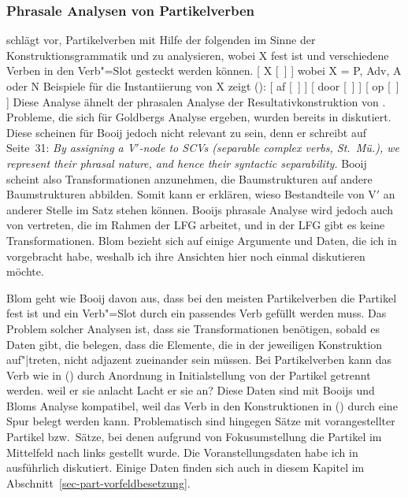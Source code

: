 \subsubsection{Phrasale Analysen von Partikelverben}
\label{sec-phrasal-pv}

\citet[Abschnitt~2]{Booij2002a} schlägt vor, Partikelverben mit Hilfe der folgenden \Konstruktion im
Sinne der Konstruktionsgrammatik und
\citet{Jackendoff97a}
zu analysieren, wobei X fest ist und verschiedene Verben in den
Verb"=Slot gesteckt werden können.
\ea
{}[ X [~] ] wobei X = P, Adv, A oder N
\z
Beispiele für die Instantiierung von X zeigt ():
\eal
\label{particle-konstruktionen}
\ex {}[ af   [~] ]
\ex {}[ door [~] ]
\ex {}[ op   [~] ]
\zl 
Diese Analyse ähnelt der phrasalen Analyse der Resultativkonstruktion von
\citet{Goldberg95a}. Probleme, die sich für Goldbergs Analyse ergeben,
wurden bereits in 
diskutiert. Diese scheinen für Booij jedoch nicht relevant zu sein,
denn er schreibt auf Seite~31: \emph{By assigning a V$'$-node to SCVs (separable complex verbs, St.\ Mü.),
we represent their phrasal nature, and hence their syntactic separability.} Booij
scheint also Transformationen anzunehmen, die Baumstrukturen
auf andere Baumstrukturen abbilden. Somit kann er erklären, wieso Bestandteile
von V$'$ an anderer Stelle im Satz stehen können.
Booijs phrasale Analyse wird jedoch auch von \citet{Blom2005a} vertreten,
die im Rahmen der LFG arbeitet,
und in der LFG gibt es keine Transformationen. Blom bezieht sich auf einige Argumente und Daten, 
die ich in 
vorgebracht habe, weshalb ich ihre Ansichten hier noch einmal diskutieren möchte.

Blom geht wie Booij davon aus, dass bei den meisten Partikelverben die Partikel fest ist und 
ein Verb"=Slot durch ein passendes Verb gefüllt werden muss. Das Problem solcher Analysen ist,
dass sie Transformationen benötigen, sobald es Daten gibt, die belegen, dass die Elemente,
die in der jeweiligen Konstruktion auf"|treten, nicht adjazent zueinander sein müssen. Bei Partikelverben
kann das Verb wie in () durch Anordnung in Initialstellung von der Partikel getrennt werden.
\eal
\ex weil er sie anlacht
\ex Lacht er sie an?
\zl
Diese Daten sind mit Booijs und Bloms Analyse kompatibel, weil das Verb in den Konstruktionen
in () durch eine Spur belegt werden kann. Problematisch sind hingegen Sätze mit vorangestellter
Partikel bzw.\ Sätze, bei denen aufgrund von Fokusumstellung die Partikel im Mittelfeld nach
links gestellt wurde. Die Voranstellungsdaten habe ich in  
ausführlich diskutiert. Einige Daten finden sich auch in diesem Kapitel im Abschnitt~\ref{sec-part-vorfeldbesetzung}.

